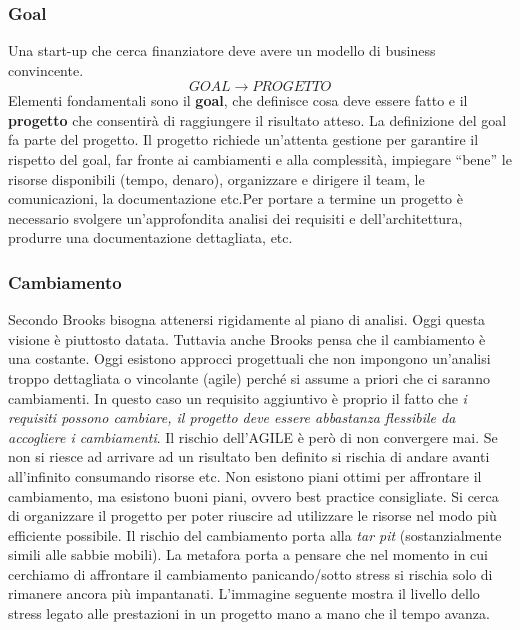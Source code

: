 \subsubsection{Goal}
Una start-up che cerca finanziatore deve avere un modello di business convincente.
$$ GOAL \xrightarrow{} PROGETTO $$
Elementi fondamentali sono il \textbf{goal}, che definisce cosa deve essere fatto e il \textbf{progetto} che consentirà  di raggiungere il risultato atteso. La definizione del goal fa parte del progetto.\newline
Il progetto richiede un’attenta gestione per garantire il rispetto del goal, far fronte ai cambiamenti e alla complessità, impiegare “bene” le risorse disponibili (tempo, denaro), organizzare e dirigere il team, le comunicazioni, la documentazione etc.\newline Per portare a termine un progetto è necessario svolgere un’approfondita analisi dei requisiti e dell’architettura, produrre una documentazione dettagliata, etc.
\subsubsection{Cambiamento}
Secondo Brooks bisogna attenersi rigidamente al piano di analisi. Oggi questa visione è piuttosto datata. Tuttavia anche Brooks pensa che il cambiamento è una costante. Oggi esistono approcci progettuali che non impongono un'analisi troppo dettagliata o vincolante (agile) perché si assume a priori che ci saranno cambiamenti. In questo caso un requisito aggiuntivo è proprio il fatto che \textit{i requisiti possono cambiare, il progetto deve essere abbastanza flessibile da accogliere i cambiamenti}. Il rischio dell'AGILE è però di non convergere mai. Se non si riesce ad arrivare ad un risultato ben definito si rischia di andare avanti all'infinito consumando risorse etc.\newline
Non esistono piani ottimi per affrontare il cambiamento, ma esistono buoni piani, ovvero best practice consigliate. Si cerca di organizzare il progetto per poter riuscire ad utilizzare le risorse nel modo più efficiente possibile.\newline
Il rischio del cambiamento porta alla \textit{tar pit} (sostanzialmente simili alle sabbie mobili). La metafora porta a pensare che nel momento in cui cerchiamo di affrontare il cambiamento panicando/sotto stress si rischia solo di rimanere ancora più impantanati.\newline
L'immagine seguente mostra il livello dello stress legato alle prestazioni in un progetto mano a mano che il tempo avanza.

